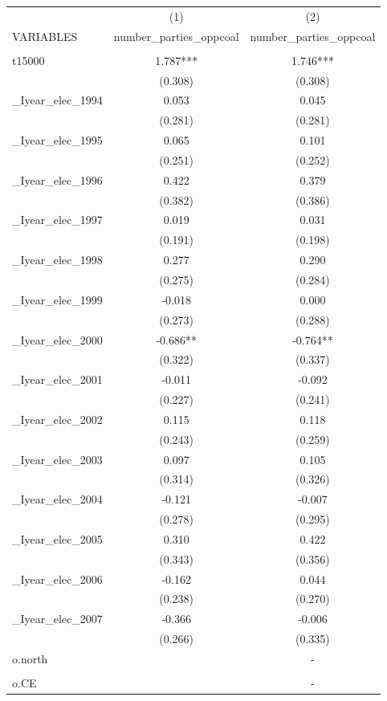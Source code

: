 \documentclass[]{article}
\begin{document}
\begin{tabular}{lcc} \hline
 & (1) & (2) \\
VARIABLES & number\_parties\_oppcoal & number\_parties\_oppcoal \\ \hline
 &  &  \\
t15000 & 1.787*** & 1.746*** \\
 & (0.308) & (0.308) \\
\_Iyear\_elec\_1994 & 0.053 & 0.045 \\
 & (0.281) & (0.281) \\
\_Iyear\_elec\_1995 & 0.065 & 0.101 \\
 & (0.251) & (0.252) \\
\_Iyear\_elec\_1996 & 0.422 & 0.379 \\
 & (0.382) & (0.386) \\
\_Iyear\_elec\_1997 & 0.019 & 0.031 \\
 & (0.191) & (0.198) \\
\_Iyear\_elec\_1998 & 0.277 & 0.290 \\
 & (0.275) & (0.284) \\
\_Iyear\_elec\_1999 & -0.018 & 0.000 \\
 & (0.273) & (0.288) \\
\_Iyear\_elec\_2000 & -0.686** & -0.764** \\
 & (0.322) & (0.337) \\
\_Iyear\_elec\_2001 & -0.011 & -0.092 \\
 & (0.227) & (0.241) \\
\_Iyear\_elec\_2002 & 0.115 & 0.118 \\
 & (0.243) & (0.259) \\
\_Iyear\_elec\_2003 & 0.097 & 0.105 \\
 & (0.314) & (0.326) \\
\_Iyear\_elec\_2004 & -0.121 & -0.007 \\
 & (0.278) & (0.295) \\
\_Iyear\_elec\_2005 & 0.310 & 0.422 \\
 & (0.343) & (0.356) \\
\_Iyear\_elec\_2006 & -0.162 & 0.044 \\
 & (0.238) & (0.270) \\
\_Iyear\_elec\_2007 & -0.366 & -0.006 \\
 & (0.266) & (0.335) \\
o.north &  & - \\
 &  &  \\
o.CE &  & - \\

\end{tabular}
\end{document}

